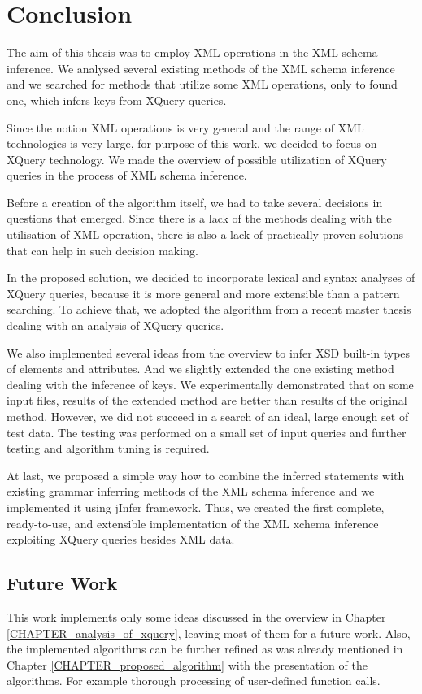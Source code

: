 \chapter{Conclusion}
The aim of this thesis was to employ XML operations in the XML schema inference. We analysed several existing methods of the XML schema inference and we searched for methods that utilize some XML operations, only to found one, which infers keys from XQuery queries.

Since the notion XML operations is very general and the range of XML technologies is very large, for purpose of this work, we decided to focus on XQuery technology. We made the overview of possible utilization of XQuery queries in the process of XML schema inference.

Before a creation of the algorithm itself, we had to take several decisions in questions that emerged. Since there is a lack of the methods dealing with the utilisation of XML operation, there is also a lack of practically proven solutions that can help in such decision making.

In the proposed solution, we decided to incorporate lexical and syntax analyses of XQuery queries, because it is more general and more extensible than a pattern searching. To achieve that, we adopted the algorithm from a recent master thesis dealing with an analysis of XQuery queries.

We also implemented several ideas from the overview to infer XSD built-in types of elements and attributes. And we slightly extended the one existing method dealing with the inference of keys. We experimentally demonstrated that on some input files, results of the extended method are better than results of the original method. However, we did not succeed in a search of an ideal, large enough set of test data. The testing was performed on a small set of input queries and further testing and algorithm tuning is required.

At last, we proposed a simple way how to combine the inferred statements with existing grammar inferring methods of the XML schema inference and we implemented it using jInfer framework. Thus, we created the first complete, ready-to-use, and extensible implementation of the XML xchema inference exploiting XQuery queries besides XML data.


\section{Future Work}
This work implements only some ideas discussed in the overview in Chapter \ref{CHAPTER_analysis_of_xquery}, leaving most of them for a future work. Also, the implemented algorithms can be further refined as was already mentioned in Chapter \ref{CHAPTER_proposed_algorithm} with the presentation of the algorithms. For example thorough processing of user-defined function calls.

